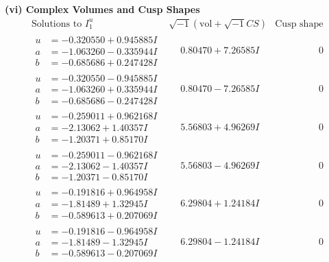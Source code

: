 \documentclass[1p]{elsarticle_modified}
\theoremstyle{definition}
\newcommand{\I}{\sqrt{-1}}
\begin{document}
\newpage\flushleft \textbf{(vi) Complex Volumes and Cusp Shapes}
$$\begin{array}{c|c|c}  
\text{Solutions to }I^u_{1}& \I (\text{vol} + \sqrt{-1}CS) & \text{Cusp shape}\\
 \hline 
\begin{aligned}
u &= -0.320550 + 0.945885 I \\
a &= -1.063260 - 0.335944 I \\
b &= -0.685686 + 0.247428 I\end{aligned}
 & \phantom{-}0.80470 + 7.26585 I & \phantom{-0.000000 } 0 \\ \hline\begin{aligned}
u &= -0.320550 - 0.945885 I \\
a &= -1.063260 + 0.335944 I \\
b &= -0.685686 - 0.247428 I\end{aligned}
 & \phantom{-}0.80470 - 7.26585 I & \phantom{-0.000000 } 0 \\ \hline\begin{aligned}
u &= -0.259011 + 0.962168 I \\
a &= -2.13062 + 1.40357 I \\
b &= -1.20371 + 0.85170 I\end{aligned}
 & \phantom{-}5.56803 + 4.96269 I & \phantom{-0.000000 } 0 \\ \hline\begin{aligned}
u &= -0.259011 - 0.962168 I \\
a &= -2.13062 - 1.40357 I \\
b &= -1.20371 - 0.85170 I\end{aligned}
 & \phantom{-}5.56803 - 4.96269 I & \phantom{-0.000000 } 0 \\ \hline\begin{aligned}
u &= -0.191816 + 0.964958 I \\
a &= -1.81489 + 1.32945 I \\
b &= -0.589613 + 0.207069 I\end{aligned}
 & \phantom{-}6.29804 + 1.24184 I & \phantom{-0.000000 } 0 \\ \hline\begin{aligned}
u &= -0.191816 - 0.964958 I \\
a &= -1.81489 - 1.32945 I \\
b &= -0.589613 - 0.207069 I\end{aligned}
 & \phantom{-}6.29804 - 1.24184 I & \phantom{-0.000000 } 0 \\ \hline\begin{aligned}

\end{aligned}
\end{array}$$
\end{document}
